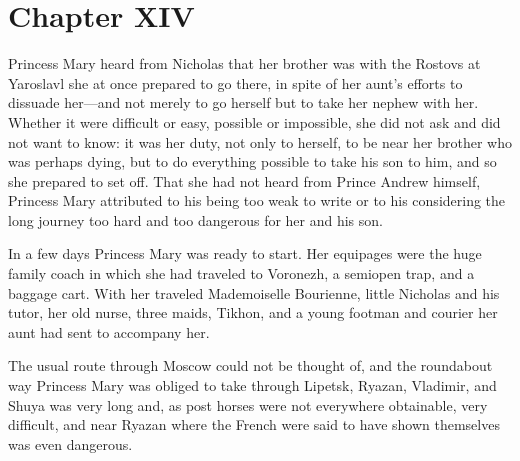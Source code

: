 
\chapter*{Chapter XIV} \ifaudio {}
\fi

 Princess Mary heard from Nicholas that her brother was with
the Rostovs at Yaroslavl she at once prepared to go there, in
spite of her aunt's efforts to dissuade her---and not merely to
go herself but to take her nephew with her. Whether it were
difficult or easy, possible or impossible, she did not ask and
did not want to know: it was her duty, not only to herself, to be
near her brother who was perhaps dying, but to do everything
possible to take his son to him, and so she prepared to set
off. That she had not heard from Prince Andrew himself, Princess
Mary attributed to his being too weak to write or to his
considering the long journey too hard and too dangerous for her
and his son.

In a few days Princess Mary was ready to start. Her equipages
were the huge family coach in which she had traveled to Voronezh,
a semiopen trap, and a baggage cart. With her traveled
Mademoiselle Bourienne, little Nicholas and his tutor, her old
nurse, three maids, Tikhon, and a young footman and courier her
aunt had sent to accompany her.

The usual route through Moscow could not be thought of, and the
roundabout way Princess Mary was obliged to take through Lipetsk,
Ryazan, Vladimir, and Shuya was very long and, as post horses
were not everywhere obtainable, very difficult, and near Ryazan
where the French were said to have shown themselves was even
dangerous.

